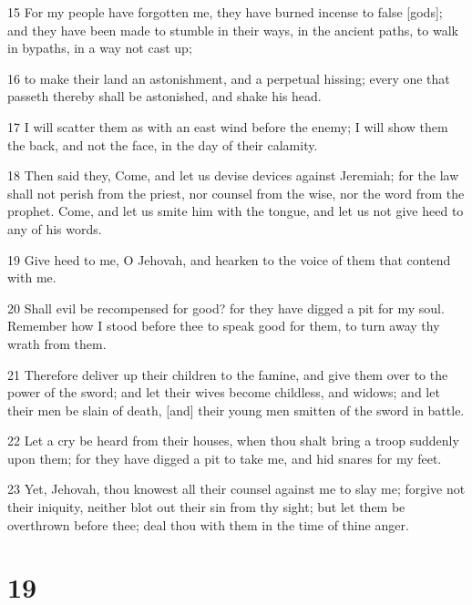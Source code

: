 \par 15 For my people have forgotten me, they have burned incense to false [gods]; and they have been made to stumble in their ways, in the ancient paths, to walk in bypaths, in a way not cast up;
\par 16 to make their land an astonishment, and a perpetual hissing; every one that passeth thereby shall be astonished, and shake his head.
\par 17 I will scatter them as with an east wind before the enemy; I will show them the back, and not the face, in the day of their calamity.
\par 18 Then said they, Come, and let us devise devices against Jeremiah; for the law shall not perish from the priest, nor counsel from the wise, nor the word from the prophet. Come, and let us smite him with the tongue, and let us not give heed to any of his words.
\par 19 Give heed to me, O Jehovah, and hearken to the voice of them that contend with me.
\par 20 Shall evil be recompensed for good? for they have digged a pit for my soul. Remember how I stood before thee to speak good for them, to turn away thy wrath from them.
\par 21 Therefore deliver up their children to the famine, and give them over to the power of the sword; and let their wives become childless, and widows; and let their men be slain of death, [and] their young men smitten of the sword in battle.
\par 22 Let a cry be heard from their houses, when thou shalt bring a troop suddenly upon them; for they have digged a pit to take me, and hid snares for my feet.
\par 23 Yet, Jehovah, thou knowest all their counsel against me to slay me; forgive not their iniquity, neither blot out their sin from thy sight; but let them be overthrown before thee; deal thou with them in the time of thine anger.

\chapter{19}

